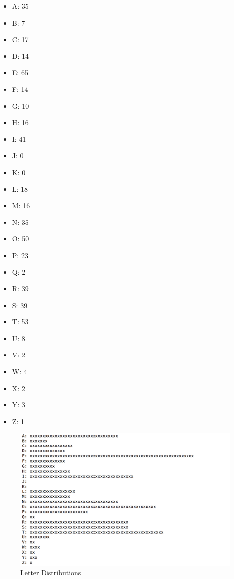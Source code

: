 \documentclass[]{article}
\begin{document}
\begin{multicols}{7}
	\begin{itemize}
		\item A: 35
		\item B: 7
		\item C: 17
		\item D: 14
		\item E: 65
		\item F: 14
		\item G: 10
		\item H: 16
		\item I: 41
		\item J: 0
		\item K: 0
		\item L: 18
		\item M: 16
		\item N: 35
		\item O: 50
		\item P: 23
		\item Q: 2
		\item R: 39
		\item S: 39
		\item T: 53
		\item U: 8
		\item V: 2
		\item W: 4
		\item X: 2
		\item Y: 3
		\item Z: 1
	\end{itemize}
\end{multicols}

\begin{figure}[H]
	\includegraphics[width=\textwidth]{frequency.png}
	\caption{Letter Distributions}
	\centering
\end{figure}
\end{document}
